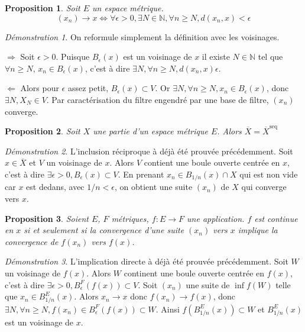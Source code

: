 \documentclass[a4paper, 11pt, french]{book}
\newenvironment{itemise}{\itemize}{\enditemize}
\theoremstyle{plain} %
\newtheorem{proposition}{Proposition}
\theoremstyle{definition} %
\theoremstyle{remark} %
\newtheorem*{demonstration}{Démonstration}
\newcommand{\1}{\mathds{1}}
\newcommand{\N}{\mathbb{N}}
\newcommand{\rm}[1]{\mathrm{#1}}
\newcommand\equivalence[3]{
	\begin{demonstration}
		#1
		\begin{itemise}
			\item[$\Longrightarrow$] #2
			\item[$\Longleftarrow$] #3
		\end{itemise}
	\end{demonstration}
}
\begin{document}
\begin{proposition}
	Soit $E$ un espace métrique.
	$$
	(x_n)\longrightarrow x
	\iff
	\forall\epsilon>0, \exists N\in\N, \forall n\geqslant N, d(x_n, x)<\epsilon
	$$
\end{proposition}

\equivalence{
	On reformule simplement la définition avec les voisinages.
}{
	Soit $\epsilon>0$.
	Puisque $B_\epsilon(x)$ est un voisinage de $x$ il existe $N\in\N$ tel que $\forall n\geqslant N$, $x_n\in B_\epsilon(x)$, c'est à dire $\exists N, \forall n\geqslant N, d(x_n, x)\epsilon$.
}{
	Alors pour $\epsilon$ assez petit, $B_\epsilon(x)\subset V$.
	Or $\exists N, \forall n\geqslant N, x_n\in B_\epsilon(x)$, donc $\exists N, X_N\in V$.
	Par caractérisation du filtre engendré par une base de filtre, $(x_n)$ converge.	
}

\begin{proposition}
	Soit $X$ une partie d'un espace métrique $E$.
	Alors $\overline{X}=\overline{X}^\rm{seq}$
\end{proposition}

\begin{demonstration}
	L'inclusion réciproque à déjà été prouvée précédemment.
	Soit $x\in\overline{X}$ et $V$ un voisinage de $x$.
	Alors $V$ contient une boule ouverte centrée en $x$, c'est à dire $\exists\epsilon>0, B_\epsilon(x)\subset V$.
	En prenant $x_n\in B_{1/n}(x)\cap X$ qui est non vide car $x$ est dedans, avec $1/n<\epsilon$, on obtient une suite $(x_n)$ de $X$ qui converge vers $x$.
\end{demonstration}

\begin{proposition}
	Soient $E$, $F$ métriques, $f:E\rightarrow F$ une application.
	$f$ est continue en $x$ si et seulement si la convergence d'une suite $(x_n)$ vers $x$ implique la convergence de $f(x_n)$ vers $f(x)$.
\end{proposition}

\begin{demonstration}
	L'implication directe à déjà été prouvée précédemment.
	Soit $W$ un voisinage de $f(x)$.
	Alors $W$ continent une boule ouverte centrée en $f(x)$, c'est à dire $\exists\epsilon>0, B^F_\epsilon(f(x))\subset V$.
	Soit $(x_n)$ une suite de $\inf{f}(W)$ telle que $x_n\in B^E_{1/n}(x)$.
	Alors $x_n\rightarrow x$ donc $f(x_n)\rightarrow f(x)$, donc $\exists N, \forall n\geqslant N, f(x_n)\in B^F_\epsilon(f(x))\subset W$.
	Ainsi $f(B^E_{1/n}(x))\subset W$ et $B^E_{1/n}(x)$ est un voisinage de $x$.
\end{demonstration}
\end{document}
